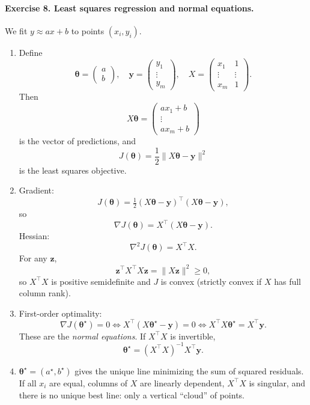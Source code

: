 \documentclass[11pt]{article}
\begin{document}
\bigskip

\paragraph{Exercise 8. Least squares regression and normal equations.}

We fit $y\approx ax+b$ to points $(x_i,y_i)$.

\begin{enumerate}
\item Define
\[
\bm{\theta}=
\begin{pmatrix}a\\ b\end{pmatrix},\quad
\bm{y}=
\begin{pmatrix}y_1\\ \vdots\\ y_m\end{pmatrix},\quad
X=
\begin{pmatrix}
x_1 & 1\\
\vdots & \vdots\\
x_m & 1
\end{pmatrix}.
\]
Then
\[
X\bm{\theta} =
\begin{pmatrix}
ax_1+b\\ \vdots\\ ax_m+b
\end{pmatrix}
\]
is the vector of predictions, and
\[
J(\bm{\theta})=\frac12\|X\bm{\theta}-\bm{y}\|^2
\]
is the least squares objective.

\item Gradient:
\[
J(\bm{\theta})=\tfrac12(X\bm{\theta}-\bm{y})^\top(X\bm{\theta}-\bm{y}),
\]
so
\[
\nabla J(\bm{\theta}) = X^\top (X\bm{\theta}-\bm{y}).
\]
Hessian:
\[
\nabla^2 J(\bm{\theta}) = X^\top X.
\]
For any $\bm{z}$,
\[
\bm{z}^\top X^\top X \bm{z} = \|X\bm{z}\|^2 \ge 0,
\]
so $X^\top X$ is positive semidefinite and $J$ is convex (strictly convex if $X$ has full column rank).

\item First-order optimality:
\[
\nabla J(\bm{\theta}^\star)=0
\Longleftrightarrow
X^\top(X\bm{\theta}^\star-\bm{y}) = 0
\Longleftrightarrow
X^\top X \bm{\theta}^\star = X^\top \bm{y}.
\]
These are the \emph{normal equations}. If $X^\top X$ is invertible,
\[
\bm{\theta}^\star = (X^\top X)^{-1} X^\top \bm{y}.
\]

\item $\bm{\theta}^\star=(a^\star,b^\star)$ gives the unique line minimizing the sum of squared residuals.  
If all $x_i$ are equal, columns of $X$ are linearly dependent, $X^\top X$ is singular, and there is no unique best line: only a vertical “cloud” of points.
\end{enumerate}
\end{document}
